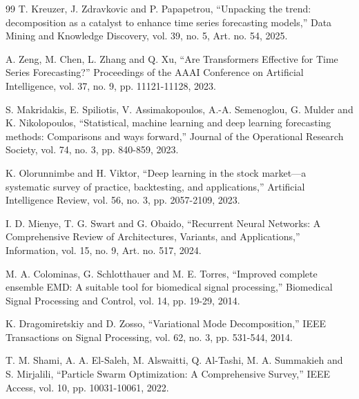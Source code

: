 \begin{thebibliography}{99}
 T. Kreuzer, J. Zdravkovic and P. Papapetrou, ``Unpacking the trend: decomposition as a
catalyst to enhance time series forecasting models,'' Data Mining and Knowledge
Discovery, vol. 39, no. 5, Art. no. 54, 2025.

 A. Zeng, M. Chen, L. Zhang and Q. Xu, ``Are Transformers Effective for Time Series
Forecasting?'' Proceedings of the AAAI Conference on Artificial Intelligence, vol. 37,
no. 9, pp. 11121-11128, 2023.

 S. Makridakis, E. Spiliotis, V. Assimakopoulos, A.-A. Semenoglou, G. Mulder and K.
Nikolopoulos, ``Statistical, machine learning and deep learning forecasting methods:
Comparisons and ways forward,'' Journal of the Operational Research Society, vol. 74,
no. 3, pp. 840-859, 2023.

 K. Olorunnimbe and H. Viktor, ``Deep learning in the stock market—a systematic survey
of practice, backtesting, and applications,'' Artificial Intelligence Review, vol. 56,
no. 3, pp. 2057-2109, 2023.

 I. D. Mienye, T. G. Swart and G. Obaido, ``Recurrent Neural Networks: A Comprehensive
Review of Architectures, Variants, and Applications,'' Information, vol. 15, no. 9,
Art. no. 517, 2024.

 M. A. Colominas, G. Schlotthauer and M. E. Torres, ``Improved complete ensemble EMD: A
suitable tool for biomedical signal processing,'' Biomedical Signal Processing and
Control, vol. 14, pp. 19-29, 2014.

 K. Dragomiretskiy and D. Zosso, ``Variational Mode Decomposition,'' IEEE Transactions
on Signal Processing, vol. 62, no. 3, pp. 531-544, 2014.

 T. M. Shami, A. A. El-Saleh, M. Alswaitti, Q. Al-Tashi, M. A. Summakieh and S.
Mirjalili, ``Particle Swarm Optimization: A Comprehensive Survey,'' IEEE Access, vol.
10, pp. 10031-10061, 2022.

\end{thebibliography}
